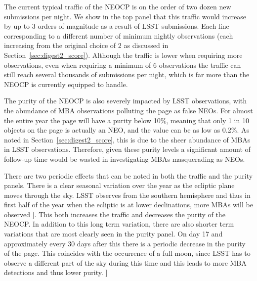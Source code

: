 \documentclass[twocolumn]{aastex631}
\newcommand{\todo}[1]{{\color{red}{[TODO: #1}]}}
\begin{document}
The current typical traffic of the NEOCP is on the order of two dozen new submissions per night. We show in the top panel that this traffic would increase by up to 3 orders of magnitude as a result of LSST submissions. Each line corresponding to a different number of minimum nightly observations (each increasing from the original choice of 2 as discussed in Section~\ref{sec:digest2_score}). Although the traffic is lower when requiring more observations, even when requiring a minimum of 6 observations the traffic can still reach several thousands of submissions per night, which is far more than the NEOCP is currently equipped to handle.

The purity of the NEOCP is also severely impacted by LSST observations, with the abundance of MBA observations polluting the page as false NEOs. For almost the entire year the page will have a purity below 10\%, meaning that only 1 in 10 objects on the page is actually an NEO, and the value can be as low as 0.2\%. As noted in Section~\ref{sec:digest2_score}, this is due to the sheer abundance of MBAs in LSST observations. Therefore, given these purity levels a significant amount of follow-up time would be wasted in investigating MBAs masquerading as NEOs.

There are two periodic effects that can be noted in both the traffic and the purity panels. There is a clear seasonal variation over the year as the ecliptic plane moves through the sky. LSST observes from the southern hemisphere and thus in first half of the year when the ecliptic is at lower declinations, more MBAs will be observed \todo{I think this is backwards...but it definitely peaks in the first half??}. This both increases the traffic and decreases the purity of the NEOCP. In addition to this long term variation, there are also shorter term variations that are most clearly seen in the purity panel. On day 17 and approximately every 30 days after this there is a periodic decrease in the purity of the page. This coincides with the occurrence of a full moon, since LSST has to observe a different part of the sky during this time and this leads to more MBA detections and thus lower purity. \todo{left this a bit handwavy, need to check with Mario}
\end{document}
